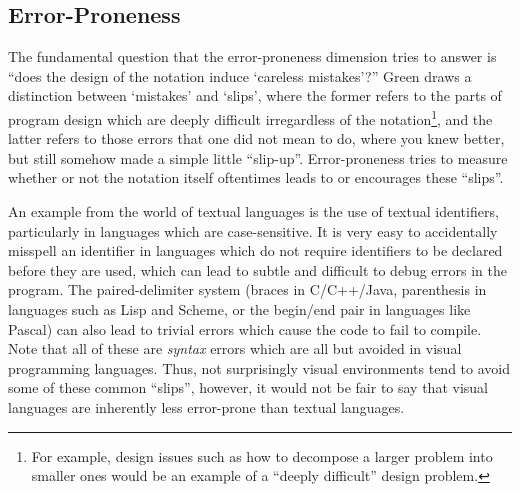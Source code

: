 \subsection{Error-Proneness}
\label{errorpronenessoutline}

The fundamental question that the error-proneness dimension tries to answer is ``does the design of the notation induce `careless mistakes'?''  Green draws a distinction between `mistakes' and `slips', where the former refers to the parts of program design which are deeply difficult irregardless of the notation\footnote{For example, design issues such as how to decompose a larger problem into smaller ones would be an example of a ``deeply difficult'' design problem.}, and the latter refers to those errors that one did not mean to do, where you knew better, but still somehow made a simple little ``slip-up''.  Error-proneness tries to measure whether or not the notation itself oftentimes leads to or encourages these ``slips''.

An example from the world of textual languages is the use of textual identifiers, particularly in languages which are case-sensitive.  It is very easy to accidentally misspell an identifier in languages which do not require identifiers to be declared before they are used, which can lead to subtle and difficult to debug errors in the program.  The paired-delimiter system (braces in C/C++/Java, parenthesis in languages such as Lisp and Scheme, or the begin/end pair in languages like Pascal) can also lead to trivial errors which cause the code to fail to compile.  Note that all of these are \emph{syntax} errors which are all but avoided in visual programming languages.  Thus, not surprisingly visual environments tend to avoid some of these common ``slips'', however, it would not be fair to say that visual languages are inherently less error-prone than textual languages.

\begin{comment}
Languages such as Pascal which use semicolons as separators rather than statement terminators can cause confusion as well, as often times novices will write: 

\code{if A then B; else C;}

rather than 

\code{if A then B else C;}

The functional language SML has a similar issue in regards to its ``let expression'' syntax.  FIXME - perhaps reference SML reference manual with explanation of how val bindings in lets do not need to end with semicolons.
\end{comment}

